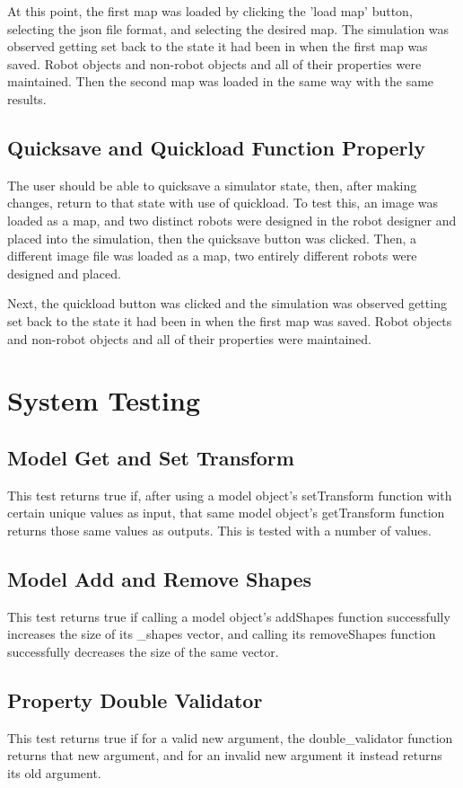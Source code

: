 At this point, the first map was loaded by clicking the 'load map' button, selecting the json file format, and selecting the desired map. The simulation was observed getting set back to the state it had been in when the first map was saved. Robot objects and non-robot objects and all of their properties were maintained. Then the second map was loaded in the same way with the same results.

\subsection{Quicksave and Quickload Function Properly}
The user should be able to quicksave a simulator state, then, after making changes, return to that state with use of quickload. To test this, an image was loaded as a map, and two distinct robots were designed in the robot designer and placed into the simulation, then the quicksave button was clicked. Then, a different image file was loaded as a map, two entirely different robots were designed and placed.

Next, the quickload button was clicked and the simulation was observed getting set back to the state it had been in when the first map was saved. Robot objects and non-robot objects and all of their properties were maintained.

\section{System Testing}

\subsection{Model Get and Set Transform}
This test returns true if, after using a model object's setTransform function with certain unique values as input, that same model object's getTransform function returns those same values as outputs. This is tested with a number of values.

\subsection{Model Add and Remove Shapes}
This test returns true if calling a model object's addShapes function successfully increases the size of its \_shapes vector, and calling its removeShapes function successfully decreases the size of the same vector.

\subsection{Property Double Validator}
This test returns true if for a valid new argument, the double\_validator function returns that new argument, and for an invalid new argument it instead returns its old argument.

